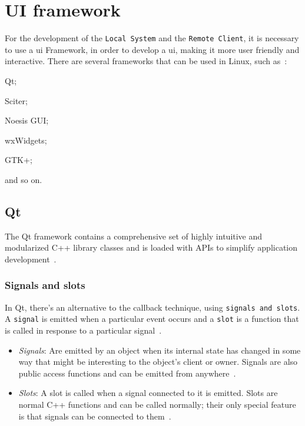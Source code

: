 %
\section{UI framework}
\label{sec:ui-framework}

For the development of the \texttt{Local System} and the \texttt{Remote Client}, it is necessary to use a \gls{ui} Framework, in order to develop a \gls{ui}, making it more user friendly and interactive.
There are several frameworks that can be used in Linux, such as~\cite{ui-lists}:
%
\begin{item-c}
\item Qt;
\item Sciter;
\item Noesis GUI;
\item wxWidgets;
\item GTK+;
\item and so on.
\end{item-c}

\subsection{Qt}

The Qt framework contains a comprehensive set of highly intuitive and modularized C++ library classes and is loaded with APIs to simplify application development~\cite{qt-site}.

\subsubsection{Signals and slots}

In Qt, there's an alternative to the callback technique, using \texttt{signals and slots}. A \texttt{signal} is emitted when a particular event occurs and a \texttt{slot} is a function that is called in response to a particular signal~\cite{qt-signals-slots}.

\begin{itemize}
\item\emph{Signals}: Are emitted by an object when its internal state has changed in some way that might be interesting to the object's client or owner. Signals are also public access functions and can be emitted from anywhere~\cite{qt-signals-slots}.
\item\emph{Slots}: A slot is called when a signal connected to it is emitted. Slots are normal C++ functions and can be called normally; their only special feature is that signals can be connected to them~\cite{qt-signals-slots}.
\end{itemize}

